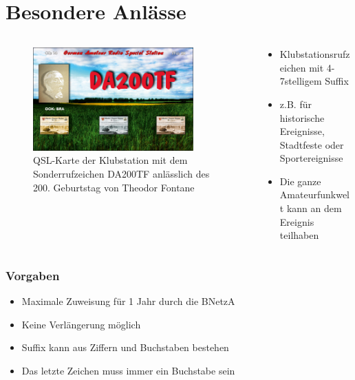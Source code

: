 
\section{Besondere Anlässe}
\label{section:besondere_anlaesse}
\begin{frame}%

\begin{columns}
    \begin{column}{0.48\textwidth}
    
\begin{figure}
    \includegraphics[width=0.85\textwidth]{foto/59}
    \caption{\scriptsize QSL-Karte der Klubstation mit dem Sonderrufzeichen DA200TF anlässlich des 200. Geburtstag von Theodor Fontane}
    \label{n_besondere_anlaesse_qsl_karte_DA200TF}
\end{figure}

    \end{column}
   \begin{column}{0.48\textwidth}
       \begin{itemize}
  \item Klubstationsrufzeichen mit 4-7stelligem Suffix
  \item z.B. für historische Ereignisse, Stadtfeste oder Sportereignisse
  \item Die ganze Amateurfunkwelt kann an dem Ereignis teilhaben
  \end{itemize}

   \end{column}
\end{columns}

\end{frame}

\begin{frame}
\frametitle{Vorgaben}
\begin{itemize}
  \item Maximale Zuweisung für 1 Jahr durch die BNetzA
  \item Keine Verlängerung möglich
  \item Suffix kann aus Ziffern und Buchstaben bestehen
  \item Das letzte Zeichen muss immer ein Buchstabe sein
  \end{itemize}
\end{frame}

